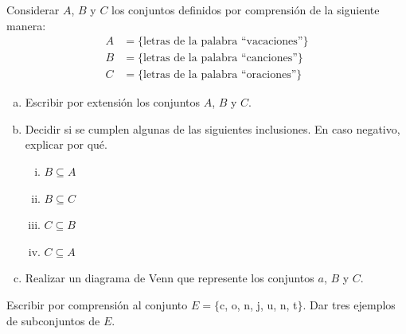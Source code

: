 \documentclass[11pt]{article}
\begin{document}
\begin{exercise}
Considerar $A$, $B$ y $C$ los conjuntos definidos por comprensión de la siguiente manera:
\begin{align*}
    A &= \{\text{letras de la palabra ``vacaciones''} \} \\
    B &= \{\text{letras de la palabra ``canciones''} \} \\
    C &= \{\text{letras de la palabra ``oraciones''} \} 
\end{align*}
\begin{enumerate}[a)]
    \item Escribir por extensión los conjuntos $A$, $B$ y $C$.
    \item Decidir si se cumplen algunas de las siguientes inclusiones. En caso negativo, explicar por qué.
        \begin{multicols}{4}
        \begin{enumerate}[i)]
            \item $B \subseteq A$
            \item $B \subseteq C$
            \item $C \subseteq B$
            \item $C \subseteq A$
        \end{enumerate}
    \end{multicols}
\item Realizar un diagrama de Venn que represente los conjuntos $a$, $B$ y $C$.
\end{enumerate}
\end{exercise}

\begin{exercise}
    Escribir por comprensión al conjunto $E = \{$c, o, n, j, u, n, t$\}$. Dar tres ejemplos de subconjuntos de $E$.
\end{exercise}
\end{document}
